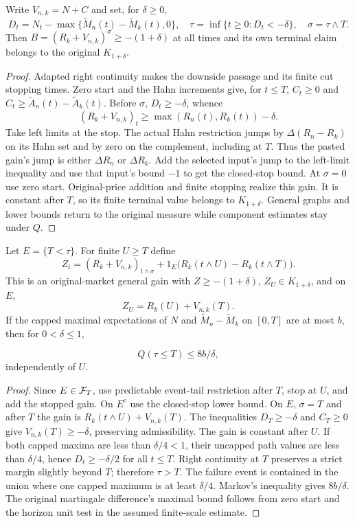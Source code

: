 \begin{proposition}
Write $V_{n,k}=N+C$ and set, for $\delta\geq0$,
\[
 D_t=N_t-\max\{\widetilde M_n(t)-\widetilde M_k(t),0\},\quad
 \tau=\inf\{t\geq0:D_t<-\delta\},\quad\sigma=\tau\wedge T.
\]
Then $B=(R_k+V_{n,k})^\sigma\geq-(1+\delta)$ at all times and its own
terminal claim belongs to the original $K_{1+\delta}$.
\end{proposition}
\begin{proof}
Adapted right continuity makes the downside passage and its finite cut
stopping times. Zero start and the Hahn increments give, for $t\leq T$,
$C_t\geq0$ and $C_t\geq\widetilde A_n(t)-\widetilde A_k(t)$.
Before $\sigma$, $D_t\geq-\delta$, whence
\[
 (R_k+V_{n,k})_t\geq\max(R_n(t),R_k(t))-\delta.
\]
Take left limits at the stop. The actual Hahn restriction jumps by
$\Delta(R_n-R_k)$ on its Hahn set and by zero on the complement, including
at $T$. Thus the pasted gain's jump is either $\Delta R_n$ or $\Delta R_k$.
Add the selected input's jump to the left-limit inequality and use that
input's bound $-1$ to get the closed-stop bound. At $\sigma=0$ use zero start.
Original-price addition and finite stopping realize this gain. It is constant
after $T$, so its finite terminal value belongs to $K_{1+\delta}$.
General graphs and lower bounds return to the original measure while
component estimates stay under $Q$.
\end{proof}
\begin{proposition}
Let $E=\{T<\tau\}$. For finite $U\geq T$ define
\[
 Z_t=(R_k+V_{n,k})_{t\wedge\sigma}
       +1_E\bigl(R_k(t\wedge U)-R_k(t\wedge T)\bigr).
\]
This is an original-market general gain with $Z\geq-(1+\delta)$,
$Z_U\in K_{1+\delta}$, and on $E$,
\[
 Z_U=R_k(U)+V_{n,k}(T).
\]
If the capped maximal expectations of $N$ and $\widetilde M_n-\widetilde M_k$
on $[0,T]$ are at most $b$, then for $0<\delta\leq1$,

\[
 Q(\tau\leq T)\leq8b/\delta,
\] independently of $U$.
\end{proposition}
\begin{proof}
Since $E\in\mathcal F_T$, use predictable event-tail restriction after $T$, stop at
$U$, and add the stopped gain. On $E^c$ use the closed-stop lower bound.
On $E$, $\sigma=T$ and after $T$ the gain is
$R_k(t\wedge U)+V_{n,k}(T)$. The inequalities $D_T\geq-\delta$ and $C_T\geq0$
give $V_{n,k}(T)\geq-\delta$, preserving admissibility. The gain is constant
after $U$.
If both capped maxima are less than $\delta/4<1$, their uncapped path values
are less than $\delta/4$, hence $D_t\geq-\delta/2$ for all $t\leq T$.
Right continuity at $T$ preserves a strict margin slightly beyond $T$;
therefore $\tau>T$. The failure event is contained in the union where one
capped maximum is at least $\delta/4$. Markov's inequality gives $8b/\delta$.
The original martingale difference's maximal bound follows from zero start
and the horizon unit test in the assumed finite-scale estimate.
\end{proof}

